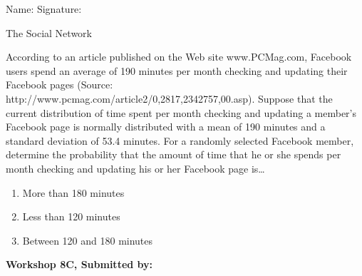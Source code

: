 \documentclass[11pt]{book}\usepackage[]{graphicx}\usepackage[]{color}
\begin{document}
\begin{exercises}
\begin{exercise}
\begin{center}
{{\vspace{4mm}
Name: \underline{\phantom{xxxxxxxxxxxxxxxxxxxxxxxx}} Signature: \underline{\phantom{xxxxxxxxxxxxxxxxxxxxxxxx}}
 }}
\end{center}

The Social Network

According to an article published on the Web site www.PCMag.com, Facebook users spend an average of 190 minutes per month checking and updating their Facebook pages (Source: http://www.pcmag.com/article2/0,2817,2342757,00.asp). Suppose that the current distribution of time spent per month checking and updating a member's Facebook page is normally distributed with a mean of 190 minutes and a standard deviation of 53.4 minutes. For a randomly selected Facebook member, determine the probability that the amount of time that he or she spends per month checking and updating his or her Facebook page is…

\begin{enumerate}
  \item More than 180 minutes
  \item Less than 120 minutes
  \item Between 120 and 180 minutes
\end{enumerate}

\end{exercise}
\begin{solution}  %

\end{solution}

\clearpage

    \begin{exercise}  %

    \begin{center}
\begin{flushleft}\textbf{\large \hfill Workshop 8C, Submitted by: }\end{flushleft}

\end{center}
\end{exercise}
\end{exercises}
\end{document}
